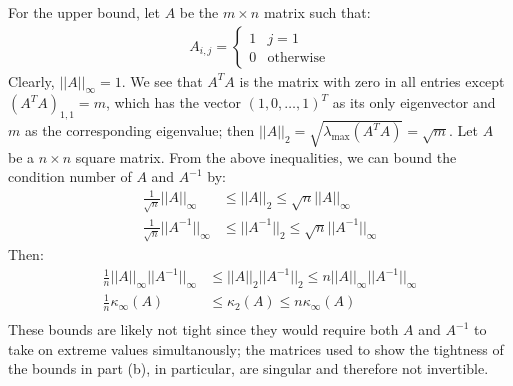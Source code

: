 \documentclass{article}
\begin{document}
For the upper bound, let $A$ be the $m \times n$ matrix such that:
\begin{align*}
    A_{i,j} = \begin{cases}
    1 & j = 1 \\
    0 & \text{otherwise}
    \end{cases}
\end{align*}
Clearly, $||A||_\infty = 1$. We see that $A^T A$ is the matrix with zero in all entries except ${(A^T A)}_{1,1} = m$, which has the vector ${(1, 0, \ldots, 1)}^T$ as its only eigenvector and $m$ as the corresponding eigenvalue; then $||A||_2 = \sqrt{\lambda_{\max}(A^T A)} = \sqrt{m}$.
Let $A$ be a $n \times n$ square matrix. From the above inequalities, we can bound the condition number of $A$ and $A^{-1}$ by:
\begin{align*}
    \frac{1}{\sqrt{n}}||A||_\infty & \leq ||A||_2 \leq \sqrt{n} ||A||_\infty \\
    \frac{1}{\sqrt{n}}||A^{-1}||_\infty & \leq ||A^{-1}||_2 \leq \sqrt{n} ||A^{-1}||_\infty
\end{align*}
Then:
\begin{align*}
    \frac{1}{n}||A||_\infty||A^{-1}||_\infty & \leq ||A||_2||A^{-1}||_2 \leq n ||A||_\infty||A^{-1}||_\infty \\
    \frac{1}{n}\kappa_\infty(A) & \leq \kappa_2(A) \leq n \kappa_\infty(A) \\
\end{align*}
These bounds are likely not tight since they would require both $A$ and $A^{-1}$ to take on extreme values simultanously; the matrices used to show the tightness of the bounds in part (b), in particular, are singular and therefore not invertible.
\end{document}
